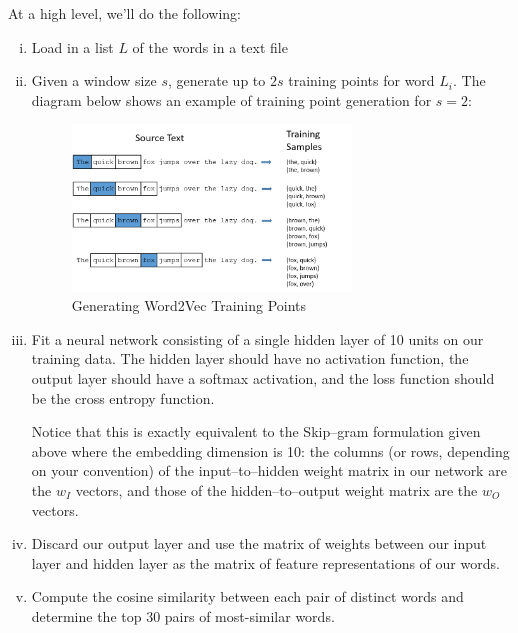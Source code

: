 At a high level, we'll do the following:
\begin{enumerate} [(i)]
\item
Load in a list $L$ of the words in a text file

\item
Given a window size $s$, generate up to $2s$ training points for
word $L_i$. The diagram below shows an example of training point generation for $s = 2$:

\begin{figure}[H]
\begin{center}
\includegraphics[width=0.7\textwidth]{plots/training_data_example.png}
\caption{Generating Word2Vec Training Points}
\end{center}
\end{figure}


\item
Fit a neural network consisting of a single hidden layer of 10 units on our training data.  The hidden layer should have no activation function, the output layer should have a softmax activation, and the loss function should be the cross entropy function.  

Notice that this is exactly equivalent to the Skip--gram formulation given above where the embedding dimension is 10: the columns (or rows, depending on your convention) of the input--to--hidden weight matrix in our network are the $w_I$ vectors, and those of the hidden--to--output weight matrix are the $w_O$ vectors.

\item
Discard our output layer and use the matrix of weights between our input layer and hidden layer as the matrix of feature representations of our words.

\item
Compute the cosine similarity between each pair of distinct words and determine the top 30 pairs of most-similar words.
\end{enumerate}

